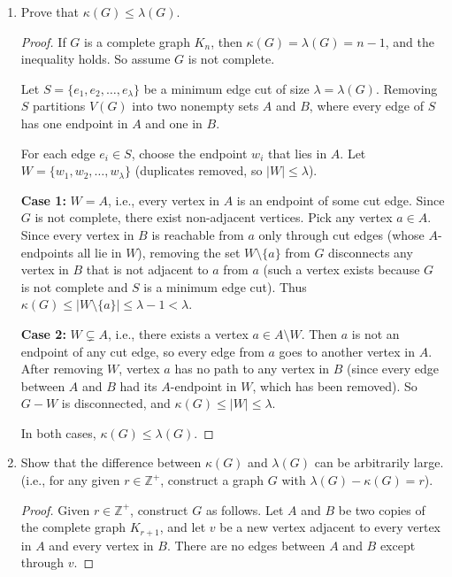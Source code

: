 \documentclass[12pt]{article}
\begin{document}
\begin{enumerate}
\item[a)] Prove that $\kappa(G) \leq \lambda(G)$.

\begin{proof}
If $G$ is a complete graph $K_n$, then $\kappa(G) = \lambda(G) = n - 1$, and the inequality holds. So assume $G$ is not complete.

Let $S = \{e_1, e_2, \ldots, e_\lambda\}$ be a minimum edge cut of size $\lambda = \lambda(G)$. Removing $S$ partitions $V(G)$ into two nonempty sets $A$ and $B$, where every edge of $S$ has one endpoint in $A$ and one in $B$.

For each edge $e_i \in S$, choose the endpoint $w_i$ that lies in $A$. Let $W = \{w_1, w_2, \ldots, w_\lambda\}$ (duplicates removed, so $|W| \leq \lambda$).

\textbf{Case 1:} $W = A$, i.e., every vertex in $A$ is an endpoint of some cut edge. Since $G$ is not complete, there exist non-adjacent vertices. Pick any vertex $a \in A$. Since every vertex in $B$ is reachable from $a$ only through cut edges (whose $A$-endpoints all lie in $W$), removing the set $W \setminus \{a\}$ from $G$ disconnects any vertex in $B$ that is not adjacent to $a$ from $a$ (such a vertex exists because $G$ is not complete and $S$ is a minimum edge cut). Thus $\kappa(G) \leq |W \setminus \{a\}| \leq \lambda - 1 < \lambda$.

\textbf{Case 2:} $W \subsetneq A$, i.e., there exists a vertex $a \in A \setminus W$. Then $a$ is not an endpoint of any cut edge, so every edge from $a$ goes to another vertex in $A$. After removing $W$, vertex $a$ has no path to any vertex in $B$ (since every edge between $A$ and $B$ had its $A$-endpoint in $W$, which has been removed). So $G - W$ is disconnected, and $\kappa(G) \leq |W| \leq \lambda$.

In both cases, $\kappa(G) \leq \lambda(G)$.
\end{proof}

\item[b)] Show that the difference between $\kappa(G)$ and $\lambda(G)$ can be arbitrarily large.\\
(i.e., for any given $r \in \mathbb{Z}^+$, construct a graph $G$ with $\lambda(G) - \kappa(G) = r$).

\begin{proof}
Given $r \in \mathbb{Z}^+$, construct $G$ as follows. Let $A$ and $B$ be two copies of the complete graph $K_{r+1}$, and let $v$ be a new vertex adjacent to every vertex in $A$ and every vertex in $B$. There are no edges between $A$ and $B$ except through $v$.


\end{proof}
\end{enumerate}
\end{document}
